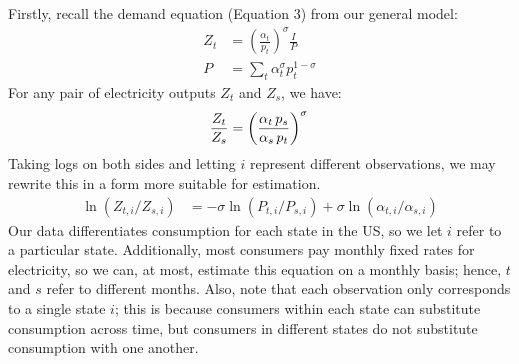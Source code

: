 \documentclass[11pt,a4paper]{extarticle}
\begin{document}
Firstly, recall the demand equation (Equation 3) from our general model:
\begin{align*}
Z_t &= \left(\frac{\alpha_t}{p_t} \right)^\sigma \frac{I}{P} \\
P &= \sum_t \alpha_t^\sigma p_t^{1-\sigma}
\end{align*}
For any pair of electricity outputs $Z_t$ and $Z_s$, we have:
$$\frac{Z_t}{Z_s} = \left(\frac{\alpha_t \, p_s}{\alpha_s \, p_t} \right)^\sigma \\$$
Taking logs on both sides and letting $i$ represent different observations, we may rewrite this in a form more suitable for estimation. 
\begin{align*}
\ln (Z_{t, i} / Z_{ s, i}) &= -\sigma \ln (P_{t,i} / P_{s,i}) + \sigma \ln (\alpha_{t,i} / \alpha_{s,i}) 
\end{align*}
Our data differentiates consumption for each state in the US, so we let $i$ refer to a particular state. Additionally, most consumers pay monthly fixed rates for electricity, so we can, at most, estimate this equation on a monthly basis; hence, $t$ and $s$ refer to different months. Also, note that each observation only corresponds to a single state $i$; this is because consumers within each state can substitute consumption across time, but consumers in different states do not substitute consumption with one another. 
\end{document}
